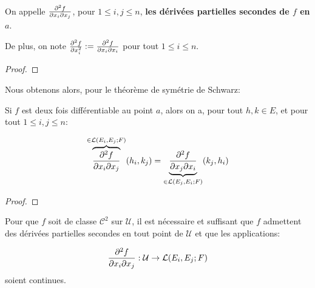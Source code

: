On appelle $\pdv{f}{x_{i}}{x_{j}} (a)$, pour $1 \leq i, j \leq n$, \textbf{les
dérivées partielles secondes de $f$ en $a$}.

De plus, on note $\pdv[2]{f}{x_{i}} (a) := \pdv{f}{x_{i}}{x_{i}} (a)$ pour tout $1 \leq i
\leq n$.

\ifdefined\outputproof
\begin{proof}



\end{proof}
\fi

Nous obtenons alors, pour le théorème de symétrie de Schwarz:

\begin{theorem}
	Si $f$ est deux fois différentiable au point $a$, alors on a, pour tout $h,
	k \in E$, et pour tout $1 \leq i, j \leq n$:

	\begin{equation}
		\overbrace{\pdv{f}{x_{i}}{x_{j}} (a)}^{\in \mathcal{L}(E_{i},
		E_{j}; F)} (h_{i}, k_{j}) = \underbrace{\pdv{f}{x_{j}}{x_{i}} (a)}_{\in
			\mathcal{L}(E_{j}, E_{i}; F)}
		(k_{j}, h_{i})
	\end{equation}
\end{theorem}

\ifdefined\outputproof
\begin{proof}

\end{proof}
\fi


\begin{proposition}
	Pour que $f$ soit de classe $\mathcal{C}^{2}$ sur $\mathcal{U}$, il est nécessaire et
	suffisant que $f$ admettent des dérivées partielles secondes en tout point
	de $\mathcal{U}$ et que les applications:

	\begin{equation}
		\pdv{f}{x_{i}}{x_{j}} (a) : \mathcal{U} \rightarrow
		\mathcal{L}(E_{i}, E_{j}; F)
	\end{equation}
	soient continues.
\end{proposition}

